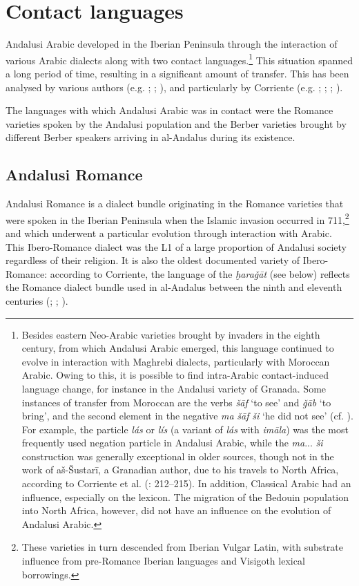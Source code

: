 \documentclass[output=paper,modfonts,nonflat]{langsci/langscibook}
\begin{document}
\section{Contact languages}
Andalusi Arabic developed in the Iberian Peninsula through the interaction of various Arabic dialects along with two contact languages.\footnote{Besides eastern Neo-Arabic varieties brought by invaders in the eighth century, from which Andalusi Arabic emerged, this language continued to evolve in interaction with Maghrebi dialects, particularly with Moroccan Arabic. Owing to this, it is possible to find intra-Arabic contact-induced language change, for instance in the Andalusi variety of Granada. Some instances of transfer from Moroccan are the verbs \textit{šāf} ‘to see’ and \textit{ǧāb} ‘to bring’, and the second element in the negative \textit{ma} \textit{šāf} \textit{ši} ‘he did not see’ (cf. \citealt[57]{Corriente1998stress}). For example, the particle \textit{lás} or \textit{lís} (a variant of \textit{lás} with \textit{imāla})  was the most frequently used negation particle in Andalusi Arabic, while the \textit{ma}... \textit{ši} construction was generally exceptional in older sources, though not in the work of aš-Šustarī, a Granadian author, due to his travels to North Africa, according to Corriente et al. (\citeyear{CorrientePereiraVicente2015}: 212--215). In addition, Classical Arabic had an influence, especially on the lexicon. The migration of the Bedouin population into North Africa, however, did not have an influence on the evolution of Andalusi Arabic.} This situation spanned a long period of time, resulting in a significant amount of transfer. This has been analysed by various authors (e.g. \citealt{Ferrando1995}; \citeyear{Ferrando1997}; \citealt{Vicente2006}), and particularly by Corriente (e.g. \citealt{Corriente1981}; \citeyear{Corriente1992book}; \citeyear{Corriente2000}; \citeyear{Corriente2002}). 

The languages with which Andalusi Arabic was in contact were the Romance varieties spoken by the Andalusi population and the Berber varieties brought by different Berber speakers arriving in al-Andalus during its existence. 

\subsection{Andalusi Romance}\label{AR}

Andalusi Romance is a dialect bundle originating in the Romance varieties that were spoken in the Iberian Peninsula when the Islamic invasion occurred in 711,\footnote{These varieties in turn descended from Iberian Vulgar Latin, with substrate influence from pre-Romance Iberian languages and Visigoth lexical borrowings.} and  which underwent a particular evolution through interaction with Arabic. This Ibero-Romance dialect was the L1 of a large proportion of Andalusi society regardless of their religion. It is also the oldest documented variety of Ibero-Romance: according to Corriente, the language of the \textit{ḫaraǧāt} (see below) reflects the Romance dialect bundle used in al-Andalus between the ninth and eleventh centuries (\citealt{Corriente1995}; \citeyear{Corriente1997poetry}; \citeyear{Corriente2000}). 
\end{document}
